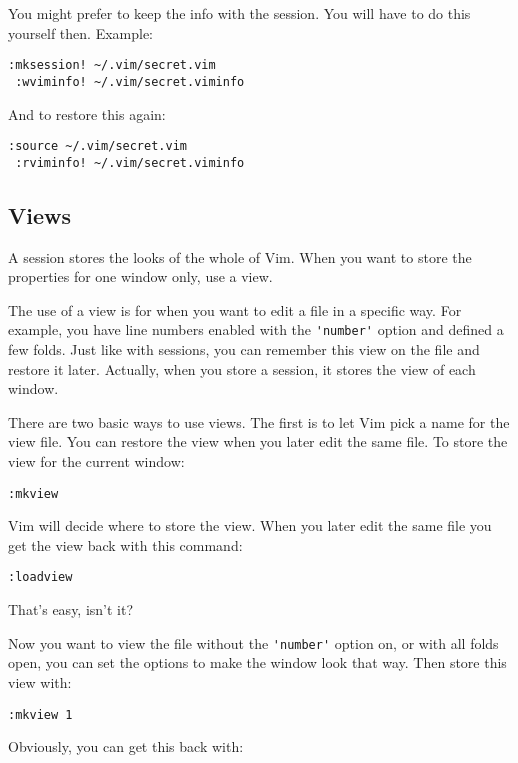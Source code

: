 You might prefer to keep the info with the session.
You will have to do this yourself then.
Example:

\begin{Verbatim}[samepage=true]
 :mksession! ~/.vim/secret.vim
 :wviminfo! ~/.vim/secret.viminfo
\end{Verbatim}

And to restore this again:

\begin{Verbatim}[samepage=true]
 :source ~/.vim/secret.vim
 :rviminfo! ~/.vim/secret.viminfo
\end{Verbatim}
\subsection{Views}
A session stores the looks of the whole of Vim.
When you want to store the properties for one window only, use a view.

The use of a view is for when you want to edit a file in a specific way.
For example, you have line numbers enabled with the \verb!'number'! option and defined a few folds.
Just like with sessions, you can remember this view on the file and restore it later.
Actually, when you store a session, it stores the view of each window.

There are two basic ways to use views.
The first is to let Vim pick a name for the view file.
You can restore the view when you later edit the same file.
To store the view for the current window:

\begin{Verbatim}[samepage=true]
 :mkview
\end{Verbatim}

Vim will decide where to store the view.
When you later edit the same file you get the view back with this command:

\begin{Verbatim}[samepage=true]
 :loadview
\end{Verbatim}

That's easy, isn't it?

Now you want to view the file without the \verb!'number'! option on, or with all folds open, you can set the options to make the window look that way.
Then store this view with:

\begin{Verbatim}[samepage=true]
 :mkview 1
\end{Verbatim}

Obviously, you can get this back with:

